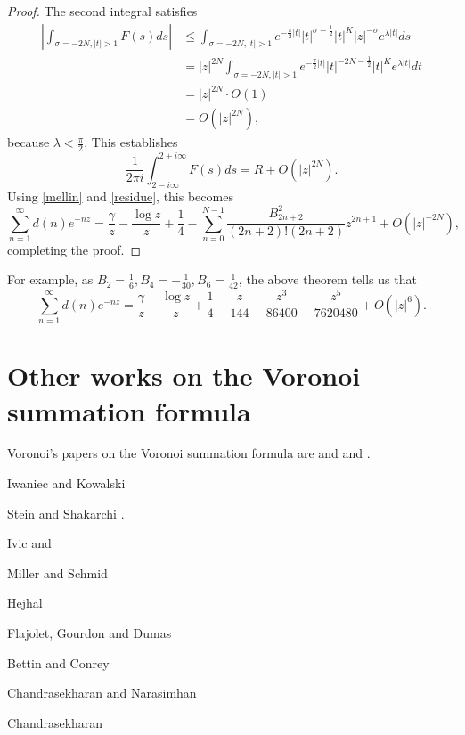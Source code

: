 \documentclass{article}
\theoremstyle{definition}
\begin{document}
\begin{proof}
The second integral satisfies
\begin{align*}
\left| \int_{\sigma=-2N, |t|>1} F(s) ds \right| &
\leq
 \int_{\sigma=-2N, |t|>1}
e^{-\frac{\pi}{2} |t|} |t|^{\sigma-\frac{1}{2}} |t|^K |z|^{-\sigma} e^{\lambda |t|}  ds\\
&=|z|^{2N}  \int_{\sigma=-2N, |t|>1} e^{-\frac{\pi}{2} |t|} |t|^{-2N-\frac{1}{2}} |t|^K  e^{\lambda |t|}  dt\\
&=|z|^{2N} \cdot O(1)\\
&=O(|z|^{2N}),
\end{align*}
because $\lambda<\frac{\pi}{2}$. This establishes
\[
\frac{1}{2\pi i} \int_{2-i\infty}^{2+i\infty} F(s) ds = R +O(|z|^{2N}).
\]
Using \eqref{mellin} and \eqref{residue}, this becomes
\[
\sum_{n=1}^\infty d(n) e^{-nz} = 
\frac{\gamma}{z}-\frac{\log z}{z}+\frac{1}{4} - \sum_{n=0}^{N-1}  \frac{B_{2n+2}^2}{(2n+2)!(2n+2)} z^{2n+1}
+O(|z|^{-2N}),
\]
completing the proof.
\end{proof}

For example,
as $B_2=\frac{1}{6},B_4=-\frac{1}{30},B_6=\frac{1}{42}$, the above theorem tells us that
\[
\sum_{n=1}^\infty d(n)e^{-nz} =  \frac{\gamma}{z}-\frac{\log z}{z}+\frac{1}{4}
-\frac{z}{144}
-\frac{z^3}{86400}
-\frac{z^5}{7620480}+
O(|z|^6).
\]


\section{Other works on the Voronoi summation formula}
Voronoi's papers on the Voronoi summation formula are \cite{voronoi1903} and \cite{voronoiI} and \cite{voronoiII}. 

Iwaniec and Kowalski \cite[Chaper 4]{iwaniec}

Stein and Shakarchi \cite[p.~392, Theorem 8.11]{stein}.

Ivic \cite[pp.~83ff., Chapter 3]{ivic} and \cite{laplace}

Miller and Schmid \cite{miller}

Hejhal \cite{hejhal}

Flajolet, Gourdon and Dumas \cite{flajolet}

Bettin and Conrey \cite{bettin}

Chandrasekharan  and Narasimhan \cite{hecke}

Chandrasekharan \cite[Chapter VIII]{chandra}




\end{document}
